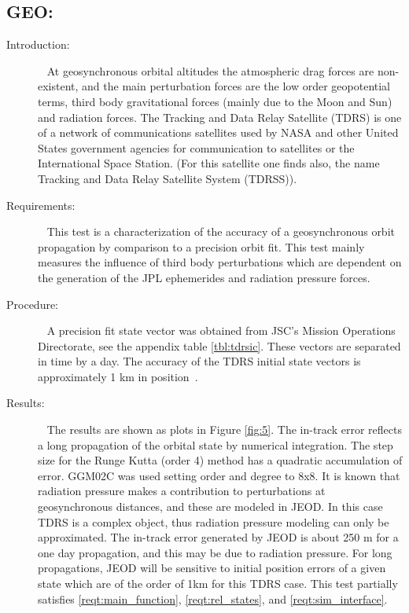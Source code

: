 \subsection{GEO:}
\label{test:tdrs}
\begin{description}
\item[Introduction:] \ \newline
At geosynchronous orbital altitudes the atmospheric drag forces are non-existent,
and the main perturbation forces are the low order geopotential terms, third body
gravitational forces (mainly due to the Moon and Sun) and radiation forces. The
Tracking and Data Relay Satellite (TDRS) is one of a network of communications
satellites used by NASA and other United States government agencies for communication
to satellites or the International Space Station. (For this satellite one finds also,
the name Tracking and Data Relay Satellite System (TDRSS)).
\item[Requirements:] \ \newline
This test is a characterization of the accuracy of a geosynchronous orbit propagation
by comparison to a precision orbit fit. This test mainly measures the influence of
third body perturbations which are dependent on the generation of the JPL ephemerides
and radiation pressure forces.
\item[Procedure:]\ \newline
A precision fit state vector was obtained from JSC's Mission Operations Directorate, \cite{topo}
see the appendix table \ref{tbl:tdrsic}.  These vectors are separated in time by a day.
The accuracy of the TDRS initial state vectors is approximately 1 km in position~\cite{tdrs}.
\item[Results:]\ \newline
The results are shown as plots in Figure \ref{fig:5}. The in-track error reflects a long
propagation of the orbital state by numerical integration. The step size for the Runge Kutta
(order 4) method has a quadratic accumulation of error. GGM02C was used setting order and
degree to 8x8. It is known that radiation pressure makes a contribution to perturbations at
geosynchronous distances, and these are modeled in JEOD. In this case TDRS is a complex object,
thus radiation pressure modeling can only be approximated. The in-track error generated by JEOD
is about 250 m for a one day propagation, and this may be due to radiation pressure. For long
propagations, JEOD will be sensitive to initial position errors of a given state which are of
the order of 1km for this TDRS case. This test partially satisfies \ref{reqt:main_function},
\ref{reqt:rel_states}, and \ref{reqt:sim_interface}.


\end{description}
